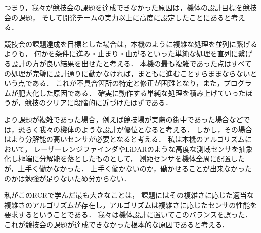 \documentclass[11pt,a4]{jsarticle}
\begin{document}
    つまり，我々が競技会の課題を達成できなかった原因は，機体の設計目標を競技会の課題，
    そして開発チームの実力以上に高度に設定したことにあると考える．

    競技会の課題達成を目標とした場合は，本機のように複雑な処理を並列に繋げるよりも，
    何かを条件に進み・止まり・曲がるといった単純な処理を直列に繋げる設計の方が良い結果を出せたと考える．
    本機の最も複雑であった点はすべての処理が完璧に設計通りに動かなければ，まともに進むことすらままならないという点である．
    これが不具合箇所の特定と修正が困難となり，また，プログラムが肥大化した原因である．
    確実に動作する単純な処理を積み上げていったほうが，競技のクリアに段階的に近づけたはずである．

    より課題が複雑であった場合，例えば競技場が実際の街中であった場合などでは，恐らく我々の機体のような設計が優位となると考える．
    しかし，その場合はより分解能の高いセンサが必要となると考える．
    私は本機のアルゴリズムにおいて，
    レーザーレンジファインダやLiDARのような高度な測域センサを抽象化し極端に分解能を落としたものとして，
    測距センサを機体全周に配置したが，上手く働かなかった．
    上手く働かないのか，働かせることが出来なかったのかは勉強が足りないため分からない．

    私がこのRCRで学んだ最も大きなことは，
    課題にはその複雑さに応じた適当な複雑さのアルゴリズムが存在し，アルゴリズムは複雑さに応じたセンサの性能を要求するということである．
    我々は機体設計に置いてこのバランスを誤った．
    これが競技会の課題が達成できなかった根本的な原因であると考える．

\end{document}
